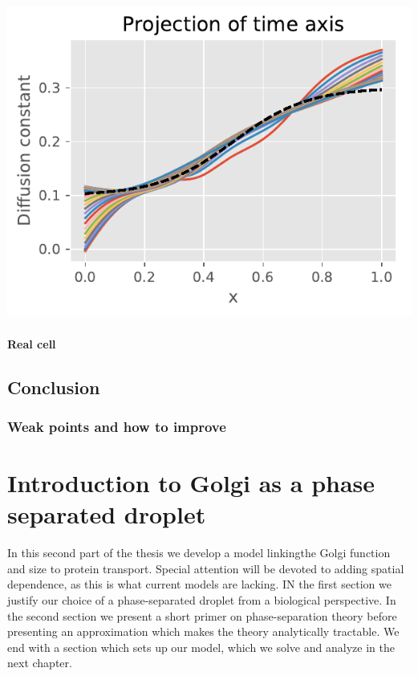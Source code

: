 \documentclass[12pt,a4paper,]{Dissertate}
\let\origfigure\figure
\let\endorigfigure\endfigure
\renewenvironment{figure}[1][2] {
    \expandafter\origfigure\expandafter[H]
} {
    \endorigfigure
}
\begin{document}
\begin{figure}
\hypertarget{fig:projectionD}{%
\centering
\includegraphics{source/figures/pdf/projection.pdf}
\caption{Projection of the inferred diffusion profile along the time
axis.}\label{fig:projectionD}
}
\end{figure}

\hypertarget{real-cell}{%
\subsubsection{Real cell}\label{real-cell}}

\hypertarget{conclusion-1}{%
\section{Conclusion}\label{conclusion-1}}

\hypertarget{weak-points-and-how-to-improve}{%
\subsection{Weak points and how to
improve}\label{weak-points-and-how-to-improve}}

\hypertarget{introduction-to-golgi-as-a-phase-separated-droplet}{%
\chapter{Introduction to Golgi as a phase separated
droplet}\label{introduction-to-golgi-as-a-phase-separated-droplet}}

In this second part of the thesis we develop a model linkingthe Golgi
function and size to protein transport. Special attention will be
devoted to adding spatial dependence, as this is what current models are
lacking. IN the first section we justify our choice of a phase-separated
droplet from a biological perspective. In the second section we present
a short primer on phase-separation theory before presenting an
approximation which makes the theory analytically tractable. We end with
a section which sets up our model, which we solve and analyze in the
next chapter.
\end{document}
